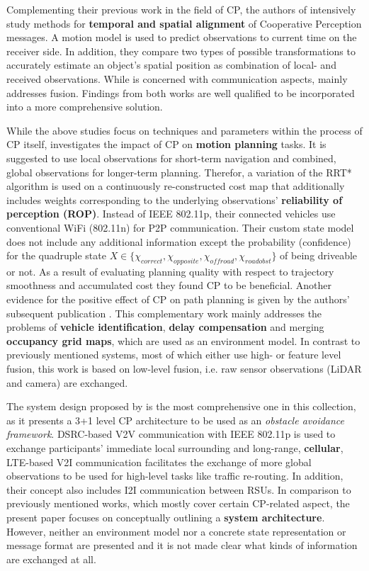 Complementing their previous work in the field of CP, the authors of \cite{Rauch2012} intensively study methods for \textbf{temporal and spatial alignment} of Cooperative Perception messages. A motion model is used to predict observations to current time on the receiver side. In addition, they compare two types of possible transformations to accurately estimate an object's spatial position as combination of local- and received observations. While \cite{Rauch2011} is concerned with communication aspects, \cite{Rauch2012} mainly addresses fusion. Findings from both works are well qualified to be incorporated into a more comprehensive solution. 
\par
\bigskip

While the above studies focus on techniques and parameters within the process of CP itself, \cite{liu2013motion} investigates the impact of CP on \textbf{motion planning} tasks. It is suggested to use local observations for short-term navigation and combined, global observations for longer-term planning. Therefor, a variation of the RRT* algorithm is used on a continuously re-constructed cost map that additionally includes weights corresponding to the underlying observations' \textbf{reliability of perception (ROP)}. Instead of IEEE 802.11p, their connected vehicles use conventional WiFi (802.11n) for P2P communication. Their custom state model does not include any additional information except the probability (confidence) for the quadruple state $X \in \{\chi_{correct}, \chi_{opposite}, \chi_{offroad}, \chi_{roadobst}\}$ of being driveable or not. As a result of evaluating planning quality with respect to trajectory smoothness and accumulated cost they found CP to be beneficial. Another evidence for the positive effect of CP on path planning is given by the authors' subsequent publication \cite{kim2013cooperative}. This complementary work mainly addresses the problems of \textbf{vehicle identification}, \textbf{delay compensation} and merging \textbf{occupancy grid maps}, which are used as an environment model. In contrast to previously mentioned systems, most of which either use high- or feature level fusion, this work is based on low-level fusion, i.e. raw sensor observations (LiDAR and camera) are exchanged. 
\par
\bigskip

The system design proposed by \cite{Calvo2017} is the most comprehensive one in this collection, as it presents a 3+1 level CP architecture to be used as an \textit{obstacle avoidance framework}. DSRC-based V2V communication with IEEE 802.11p is used to exchange participants' immediate local surrounding and long-range, \textbf{cellular}, LTE-based V2I communication facilitates the exchange of more global observations to be used for high-level tasks like traffic re-routing. In addition, their concept also includes I2I communication between RSUs. In comparison to previously mentioned works, which mostly cover certain CP-related aspect, the present paper focuses on conceptually outlining a \textbf{system architecture}. However, neither an environment model nor a concrete state representation or message format are presented and it is not made clear what kinds of information are exchanged at all. 
\par
\bigskip


